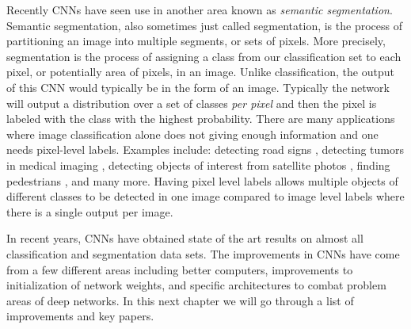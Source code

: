 Recently CNNs have seen use in another area known as \textit{semantic segmentation}.
Semantic segmentation, also sometimes just called segmentation, is the process of partitioning an image into multiple segments, or sets of pixels. 
More precisely, segmentation is the process of assigning a class from our classification set to each pixel, or potentially area of pixels, in an image. 
Unlike classification, the output of this CNN would typically be in the form of an image.
Typically the network will output a distribution over a set of classes \textit{per pixel} and then the pixel is labeled with the class with the highest probability. 
There are many applications where image classification alone does not giving enough information and one needs pixel-level labels. 
Examples include: detecting road signs \cite{maldonado2007road}, detecting tumors in medical imaging \cite{li2015automatic, lyksborg2015ensemble, kainz2015semantic, havaei2017brain}, detecting objects of interest from satellite photos \cite{chen2013vehicle}, finding pedestrians \cite{du2016fused}, and many more. 
Having pixel level labels allows multiple objects of different classes to be detected in one image compared to image level labels where there is a single output per image.

In recent years, CNNs have obtained state of the art results on almost all classification and segmentation data sets. 
The improvements in CNNs have come from a few different areas including better computers, improvements to initialization of network weights, and specific architectures to combat problem areas of deep networks. 
In this next chapter we will go through a list of improvements and key papers.  